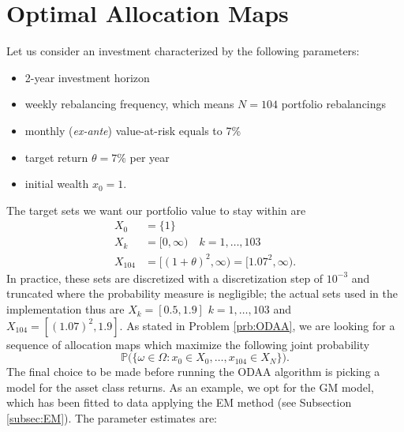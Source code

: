 \section{Optimal Allocation Maps}\label{sec:Allocation_Maps}
Let us consider an investment characterized by the following parameters:
\begin{itemize}
	\item 2-year investment horizon
	\item weekly rebalancing frequency, which means $N=104$ portfolio rebalancings
	\item monthly (\textit{ex-ante}) value-at-risk equals to 7\%
	\item target return $\theta=7\%$ per year
	\item initial wealth $x_0 = 1$.
\end{itemize}
The target sets we want our portfolio value to stay within are 
\begin{align*}
X_0 & = \{1\}\\
X_k & = [0,\infty) \quad k = 1,\ldots,103 \\
X_{104} & = [(1+\theta)^2,\infty) = [1.07^2,\infty).
\end{align*}
In practice, these sets are discretized with a discretization step of $10^{-3}$ and truncated where the probability measure is negligible; the actual sets used in the implementation thus are $X_k = [0.5,1.9]$ $k=1,\ldots,103$ and $X_{104}=[(1.07)^2,1.9]$. As stated in Problem \ref{prb:ODAA}, we are looking for a sequence of allocation maps which maximize the following joint probability
\[ \mathbb{P}\big(\{\omega \in \Omega : x_0 \in X_0,\ldots,x_{104} \in X_N \} \big).\]
The final choice to be made before running the \gls{ODAA} algorithm is picking a model for the asset class returns. As an example, we opt for the \gls{GM} model, which has been fitted to data applying the \gls{EM} method (see Subsection \ref{subsec:EM}). The parameter estimates are:


